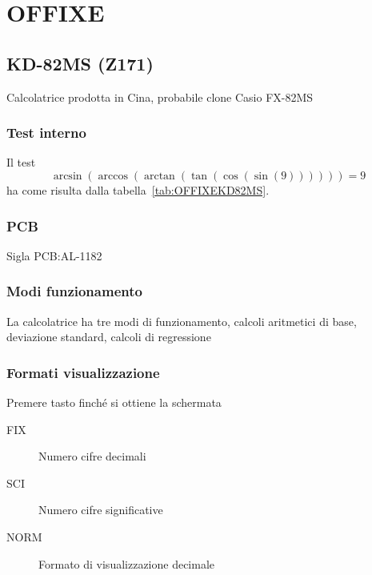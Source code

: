\chapter{OFFIXE}
\section{KD-82MS (Z171)}
Calcolatrice prodotta in Cina, probabile clone Casio FX-82MS
\subsection{Test interno}
Il test\[\arcsin(\arccos(\arctan(\tan(\cos(\sin(9))))))=9\] ha come risulta dalla tabella~\vref{tab:OFFIXEKD82MS}. 
\subsection{PCB}
Sigla PCB:AL-1182
\subsection{Modi funzionamento}
La calcolatrice ha tre modi di funzionamento, calcoli aritmetici di base, deviazione standard, calcoli di regressione
\subsection{Formati visualizzazione}
Premere tasto \tastomode finché si ottiene la schermata
\begin{center}
	\CASIOmodediplayexp
	
\end{center}
\begin{description}
	\item[ FIX]Numero cifre decimali
	\item[ SCI]Numero cifre significative
	\item[ NORM]Formato di visualizzazione decimale
\end{description}

